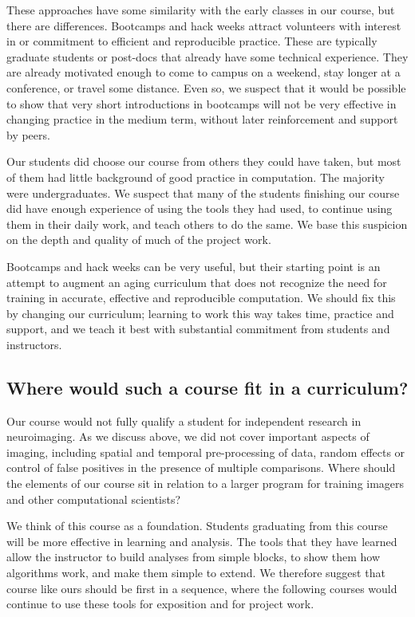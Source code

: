 These approaches have some similarity with the early classes in our course,
but there are differences.  Bootcamps and hack weeks attract volunteers with
interest in or commitment to efficient and reproducible practice. These are
typically graduate students or post-docs that already have some technical
experience.  They are already motivated enough to come to campus on a weekend,
stay longer at a conference, or travel some distance.  Even so, we suspect
that it would be possible to show that very short introductions in
bootcamps will not be very effective in changing practice in the medium term,
without later reinforcement and support by peers.

Our students did choose our course from others they could have taken, but most
of them had little background of good practice in computation.  The majority
were undergraduates.  We suspect that many of the students finishing our
course did have enough experience of using the tools they had used, to
continue using them in their daily work, and teach others to do the same.  We
base this suspicion on the depth and quality of much of the project work.

Bootcamps and hack weeks can be very useful, but their starting point is an
attempt to augment an aging curriculum that does not recognize the need for
training in accurate, effective and reproducible computation.  We should fix
this by changing our curriculum; learning to work this way takes time,
practice and support, and we teach it best with substantial commitment from
students and instructors.

\subsection{Where would such a course fit in a curriculum?}

Our course would not fully qualify a student for independent research in
neuroimaging.  As we discuss above, we did not cover important aspects of
imaging, including spatial and temporal pre-processing of data, random effects
or control of false positives in the presence of multiple comparisons.  Where
should the elements of our course sit in relation to a larger program for
training imagers and other computational scientists?

We think of this course as a foundation.  Students graduating from this course
will be more effective in learning and analysis.  The tools that they have
learned allow the instructor to build analyses from simple blocks, to
show them how algorithms work, and make them simple to extend.  We therefore
suggest that course like ours should be first in a sequence, where the
following courses would continue to use these tools for exposition and for
project work.

